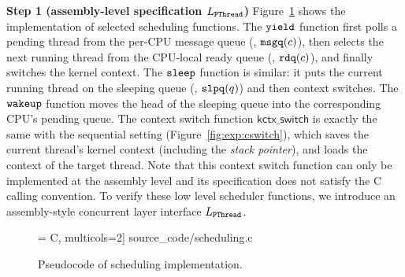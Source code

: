 {\noindent\textbf{Step 1 (assembly-level specification $L_{\texttt{PThread}}$)} 
Figure~\ref{fig:exp:sched} shows the implementation
of selected scheduling functions.
The ${\texttt{yield}}$ function first polls a pending
thread from the per-CPU message queue
(\ie, ${\texttt{msgq}}(c)$),
then selects the next running thread
from the CPU-local ready queue
(\ie, ${\texttt{rdq}}(c)$),
and finally switches the kernel context.
The ${\texttt{sleep}}$ function is similar: it
puts the current running thread
on the sleeping queue (\ie, ${\texttt{slpq}}(q)$) and
then context switches.
The ${\texttt{wakeup}}$ function moves the head of the sleeping queue
into the corresponding CPU's pending queue.
The context switch function $\mathsf{kctx\_switch}$
is exactly the same with the sequential setting (\cf Figure~\ref{fig:exp:cswitch}), which 
saves the current thread's kernel context (including the 
\emph{stack pointer}),
and loads the context of the target thread.
Note that this context switch function can only be implemented at the assembly level
and its specification does not satisfy the C calling convention.
To verify these low level scheduler functions, we introduce an
assembly-style concurrent layer interface $L_{\texttt{PThread}}$.
\begin{figure}[t]
 = C, multicols=2] {source_code/scheduling.c}
\caption{Pseudocode of scheduling implementation.}
\label{fig:exp:sched}
\hrulefill
\end{figure}


}
